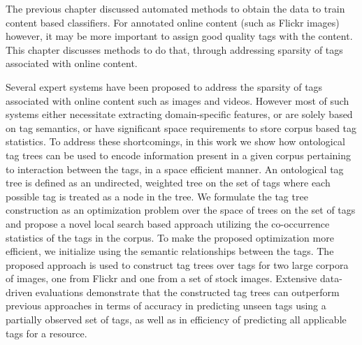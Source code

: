 
The previous chapter discussed automated methods to obtain the data to train content based classifiers. For annotated online content (such as Flickr images) however, it may be more important to assign good quality tags with the content. This chapter discusses methods to do that, through addressing sparsity of tags associated with online content. 


Several expert systems have been proposed to address the sparsity of tags associated with online content such as images and videos. However most of such systems either necessitate extracting domain-specific features, or are solely based on tag semantics, or have significant space requirements to store corpus based tag statistics. To address these shortcomings, in this work we show how ontological tag trees can be used to encode information present in a given corpus pertaining to interaction between the tags, in a space efficient manner. An ontological tag tree is defined as an undirected, weighted tree on the set of tags where each possible tag is treated as a node in the tree. We formulate the tag tree construction as an optimization problem over the space of trees on the set of tags and propose a novel local search based approach utilizing the co-occurrence statistics of the tags in the corpus. To make the proposed optimization more efficient, we initialize using the semantic relationships between the tags. The proposed approach is used to construct tag trees over tags for two large corpora of images, one from Flickr and one from a set of stock images. Extensive data-driven evaluations demonstrate that the constructed tag trees can outperform previous approaches in terms of accuracy in predicting unseen tags using a partially observed set of tags, as well as in efficiency of predicting all applicable tags for a resource. 









